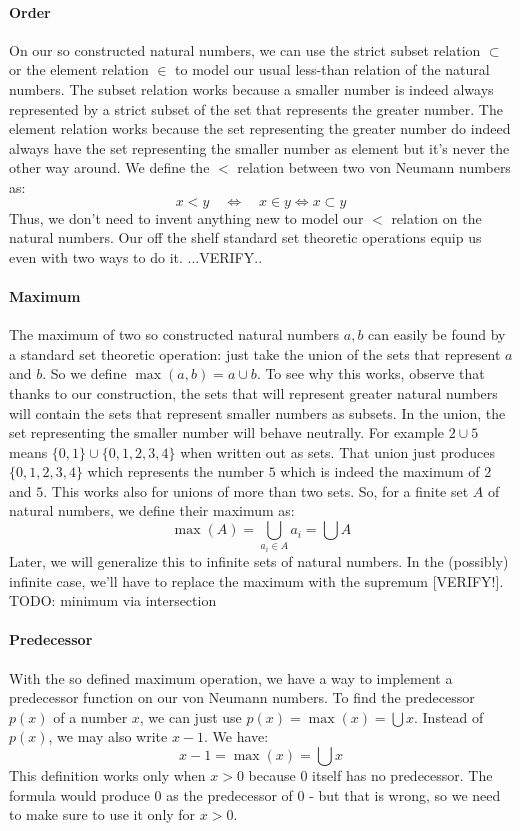 \paragraph{Order}
On our so constructed natural numbers, we can use the strict subset relation $\subset$ or the element relation $\in$ to model our usual less-than relation of the natural numbers. The subset relation works because a smaller number is indeed always represented by a strict subset of the set that represents the greater number. The element relation works because the set representing the greater number do indeed always have the set representing the smaller number as element but it's never the other way around. We define the $<$ relation between two von Neumann numbers as:
\begin{equation}
x < y  \quad \Leftrightarrow \quad x \in y \Leftrightarrow x \subset y
\end{equation}
Thus, we don't need to invent anything new to model our $<$ relation on the natural numbers. Our off the shelf standard set theoretic operations equip us even with two ways to do it. ...VERIFY..

\paragraph{Maximum}
The maximum of two so constructed natural numbers $a,b$ can easily be found by a standard set theoretic operation: just take the union of the sets that represent $a$ and $b$. So we define $\max(a,b) = a \cup b$. To see why this works, observe that thanks to our construction, the sets that will represent greater natural numbers will contain the sets that represent smaller numbers as subsets. In the union, the set representing the smaller number will behave neutrally. For example $2 \cup 5$ means $\{0,1\} \cup \{0,1,2,3,4\}$ when written out as sets. That union just produces $\{0,1,2,3,4\}$ which represents the number $5$ which is indeed the maximum of $2$ and $5$. This works also for unions of more than two sets. So, for a finite set $A$ of natural numbers, we define their maximum as:
\begin{equation}
\max(A) = \bigcup_{a_i \in A} a_i = \bigcup A
\end{equation}
Later, we will generalize this to infinite sets of natural numbers. In the (possibly) infinite case, we'll have to replace the maximum with the supremum [VERIFY!]. TODO: minimum via intersection

\paragraph{Predecessor}
With the so defined maximum operation, we have a way to implement a predecessor function on our von Neumann numbers. To find the predecessor $p(x)$ of a number $x$, we can just use $p(x) = \max(x) = \bigcup x$. Instead of $p(x)$, we may also write $x-1$. We have:
\begin{equation}
x - 1 = \max(x) = \bigcup x
\end{equation}
This definition works only when $x > 0$ because $0$ itself has no predecessor. The formula would produce $0$ as the predecessor of $0$ - but that is wrong, so we need to make sure to use it only for $x > 0$.

